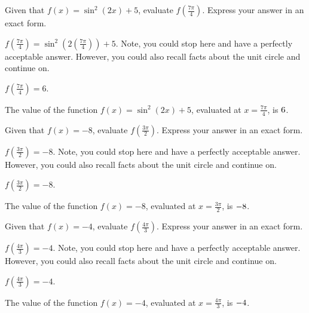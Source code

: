 \begin{shuffle}
\begin{exercise}
Given that $f(x)=\sin ^2(2 x)+5$, evaluate $f(\frac{7 \pi }{4})$. Express your answer in an exact form.
\begin{solution}
\begin{hint}
$f(\frac{7 \pi }{4})=\sin ^2(2 (\frac{7 \pi }{4}))+5$. Note, you could stop here and have a perfectly acceptable answer. However, you could also recall facts about the unit circle and continue on. 
\end{hint}
\begin{hint}
$f(\frac{7 \pi }{4})=6$.
\end{hint}
The value of the function $f(x) = \sin ^2(2 x)+5$, evaluated at $x=\frac{7 \pi }{4}$, is ${6}$.
\end{solution}
\end{exercise}

\begin{exercise}
Given that $f(x)=-8$, evaluate $f(\frac{3 \pi }{2})$. Express your answer in an exact form.
\begin{solution}
\begin{hint}
$f(\frac{3 \pi }{2})=-8$. Note, you could stop here and have a perfectly acceptable answer. However, you could also recall facts about the unit circle and continue on. 
\end{hint}
\begin{hint}
$f(\frac{3 \pi }{2})=-8$.
\end{hint}
The value of the function $f(x) = -8$, evaluated at $x=\frac{3 \pi }{2}$, is ${-8}$.
\end{solution}
\end{exercise}

\begin{exercise}
Given that $f(x)=-4$, evaluate $f(\frac{4 \pi }{3})$. Express your answer in an exact form.
\begin{solution}
\begin{hint}
$f(\frac{4 \pi }{3})=-4$. Note, you could stop here and have a perfectly acceptable answer. However, you could also recall facts about the unit circle and continue on. 
\end{hint}
\begin{hint}
$f(\frac{4 \pi }{3})=-4$.
\end{hint}
The value of the function $f(x) = -4$, evaluated at $x=\frac{4 \pi }{3}$, is ${-4}$.
\end{solution}
\end{exercise}


\end{shuffle}
